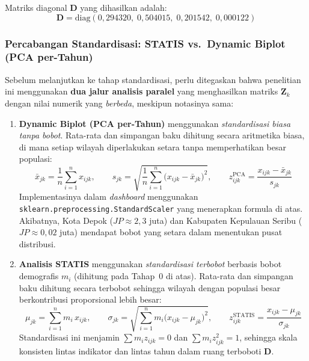 Matriks diagonal $\mathbf{D}$ yang dihasilkan adalah:
\[ \mathbf{D} = \text{diag}(0{,}294320,\; 0{,}504015,\; 0{,}201542,\; 0{,}000122) \]

\subsubsection{Percabangan Standardisasi: STATIS vs.\ Dynamic Biplot (PCA per-Tahun)}
\label{subsubsec:zk_fork}

Sebelum melanjutkan ke tahap standardisasi, perlu ditegaskan bahwa penelitian ini menggunakan \textbf{dua jalur analisis paralel} yang menghasilkan matriks $\mathbf{Z}_k$ dengan nilai numerik yang \emph{berbeda}, meskipun notasinya sama:

\begin{enumerate}
    \item \textbf{Dynamic Biplot (PCA per-Tahun)} menggunakan \emph{standardisasi biasa tanpa bobot}. Rata-rata dan simpangan baku dihitung secara aritmetika biasa, di mana setiap wilayah diperlakukan setara tanpa memperhatikan besar populasi:
    \begin{equation}
        \bar{x}_{jk} = \frac{1}{n}\sum_{i=1}^{n} x_{ijk},
        \qquad
        s_{jk} = \sqrt{\frac{1}{n}\sum_{i=1}^{n}\bigl(x_{ijk} - \bar{x}_{jk}\bigr)^2},
        \qquad
        z_{ijk}^{\text{PCA}} = \frac{x_{ijk} - \bar{x}_{jk}}{s_{jk}}
        \label{eq:zk_pca}
    \end{equation}
    Implementasinya dalam \textit{dashboard} menggunakan \texttt{sklearn.preprocessing.StandardScaler} yang menerapkan formula di atas. Akibatnya, Kota Depok ($JP \approx 2{,}3$ juta) dan Kabupaten Kepulauan Seribu ($JP \approx 0{,}02$ juta) mendapat bobot yang setara dalam menentukan pusat distribusi.

    \item \textbf{Analisis STATIS} menggunakan \emph{standardisasi terbobot} berbasis bobot demografis $m_i$ (dihitung pada Tahap~0 di atas). Rata-rata dan simpangan baku dihitung secara terbobot sehingga wilayah dengan populasi besar berkontribusi proporsional lebih besar:
    \begin{equation}
        \mu_{jk} = \sum_{i=1}^{n} m_i\, x_{ijk},
        \qquad
        \sigma_{jk} = \sqrt{\sum_{i=1}^{n} m_i\bigl(x_{ijk} - \mu_{jk}\bigr)^2},
        \qquad
        z_{ijk}^{\text{STATIS}} = \frac{x_{ijk} - \mu_{jk}}{\sigma_{jk}}
        \label{eq:zk_statis}
    \end{equation}
    Standardisasi ini menjamin $\sum m_i z_{ijk} = 0$ dan $\sum m_i z_{ijk}^2 = 1$, sehingga skala konsisten lintas indikator dan lintas tahun dalam ruang terboboti $\mathbf{D}$.
\end{enumerate}

